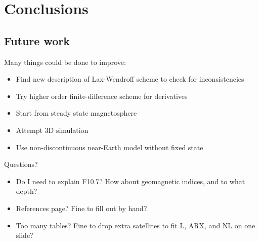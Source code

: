 \documentclass[xcolor={dvipsnames,table}]{beamer}
\begin{document}
\section{Conclusions}



\subsection{Future work}
\begin{frame}
	Many things could be done to improve:
	\begin{itemize}
		\item Find new description of Lax-Wendroff scheme to check for inconsistencies
		\item Try higher order finite-difference scheme for derivatives
		\item Start from steady state magnetosphere
		\item Attempt 3D simulation
		\item Use non-discontinuous near-Earth model without fixed state
	\end{itemize}
\end{frame}

\begin{frame}[c]
	\begin{center}
		\huge
		Questions?
	\end{center}
	\small
	\begin{itemize}
		\item Do I need to explain F10.7? How about geomagnetic indices, and to what depth?
		\item References page? Fine to fill out by hand?
		\item Too many tables? Fine to drop extra satellites to fit L, ARX, and NL on one slide?
	\end{itemize}
\end{frame}





\begin{frame}
	\tiny
	
	
\end{frame}
\end{document}
